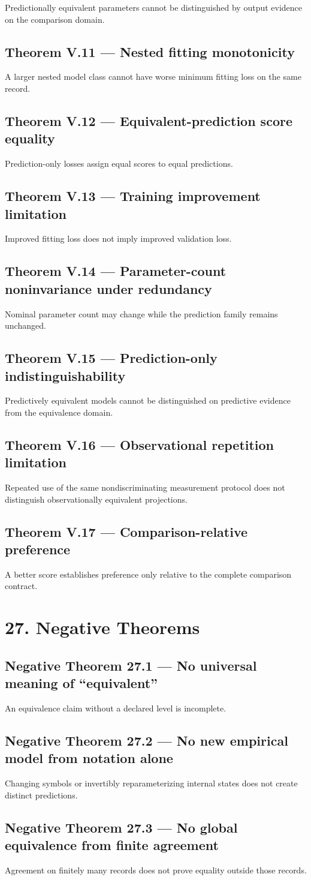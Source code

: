 \documentclass[11pt,oneside,openany]{book}
\newcommand{\PCsection}[1]{%
  \section*{#1}\addcontentsline{toc}{section}{#1}%
}
\newcommand{\PCsubsection}[1]{%
  \subsection*{#1}%
}
\begin{document}
Predictionally equivalent parameters cannot be distinguished by output evidence on the comparison domain.

\PCsubsection{Theorem V.11 --- Nested fitting monotonicity}

A larger nested model class cannot have worse minimum fitting loss on the same record.

\PCsubsection{Theorem V.12 --- Equivalent-prediction score equality}

Prediction-only losses assign equal scores to equal predictions.

\PCsubsection{Theorem V.13 --- Training improvement limitation}

Improved fitting loss does not imply improved validation loss.

\PCsubsection{Theorem V.14 --- Parameter-count noninvariance under redundancy}

Nominal parameter count may change while the prediction family remains unchanged.

\PCsubsection{Theorem V.15 --- Prediction-only indistinguishability}

Predictively equivalent models cannot be distinguished on predictive evidence from the equivalence domain.

\PCsubsection{Theorem V.16 --- Observational repetition limitation}

Repeated use of the same nondiscriminating measurement protocol does not distinguish observationally equivalent projections.

\PCsubsection{Theorem V.17 --- Comparison-relative preference}

A better score establishes preference only relative to the complete comparison contract.


\PCsection{27. Negative Theorems}

\PCsubsection{Negative Theorem 27.1 --- No universal meaning of “equivalent”}

An equivalence claim without a declared level is incomplete.

\PCsubsection{Negative Theorem 27.2 --- No new empirical model from notation alone}

Changing symbols or invertibly reparameterizing internal states does not create distinct predictions.

\PCsubsection{Negative Theorem 27.3 --- No global equivalence from finite agreement}

Agreement on finitely many records does not prove equality outside those records.
\end{document}
